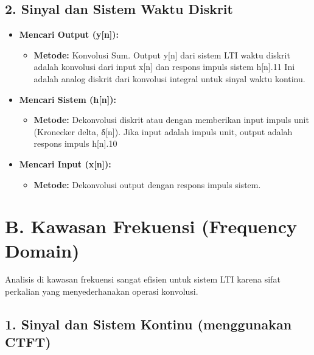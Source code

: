 \documentclass[
  letterpaper,
  DIV=11,
  numbers=noendperiod]{scrreprt}
\providecommand{\tightlist}{%
  \setlength{\itemsep}{0pt}\setlength{\parskip}{0pt}}\usepackage{longtable,booktabs,array}
\begin{document}
\subsection{2. Sinyal dan Sistem Waktu
Diskrit}\label{sinyal-dan-sistem-waktu-diskrit}

\begin{itemize}
\item
  \textbf{Mencari Output (y{[}n{]}):}

  \begin{itemize}
  \tightlist
  \item
    \textbf{Metode:} Konvolusi Sum. Output y{[}n{]} dari sistem LTI
    waktu diskrit adalah konvolusi dari input x{[}n{]} dan respons
    impuls sistem h{[}n{]}.11 Ini adalah analog diskrit dari konvolusi
    integral untuk sinyal waktu kontinu.
  \end{itemize}
\item
  \textbf{Mencari Sistem (h{[}n{]}):}

  \begin{itemize}
  \tightlist
  \item
    \textbf{Metode:} Dekonvolusi diskrit atau dengan memberikan input
    impuls unit (Kronecker delta, δ{[}n{]}). Jika input adalah impuls
    unit, output adalah respons impuls h{[}n{]}.10
  \end{itemize}
\item
  \textbf{Mencari Input (x{[}n{]}):}

  \begin{itemize}
  \tightlist
  \item
    \textbf{Metode:} Dekonvolusi output dengan respons impuls sistem.
  \end{itemize}
\end{itemize}

\section{B. Kawasan Frekuensi (Frequency
Domain)}\label{b.-kawasan-frekuensi-frequency-domain-1}

Analisis di kawasan frekuensi sangat efisien untuk sistem LTI karena
sifat perkalian yang menyederhanakan operasi konvolusi.

\subsection{1. Sinyal dan Sistem Kontinu (menggunakan
CTFT)}\label{sinyal-dan-sistem-kontinu-menggunakan-ctft}
\end{document}
